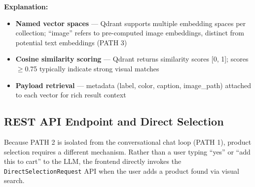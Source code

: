 \textbf{Explanation:}
\begin{itemize}
    \item \textbf{Named vector spaces} --- Qdrant supports multiple embedding spaces per collection; ``image'' refers to pre-computed image embeddings, distinct from potential text embeddings (PATH 3)
    \item \textbf{Cosine similarity scoring} --- Qdrant returns similarity scores [0, 1]; scores $\geq$0.75 typically indicate strong visual matches
    \item \textbf{Payload retrieval} --- metadata (label, color, caption, image\_path) attached to each vector for rich result context
\end{itemize}

\subsection{REST API Endpoint and Direct Selection}

Because PATH 2 is isolated from the conversational chat loop (PATH 1), product selection requires a different mechanism. Rather than a user typing ``yes'' or ``add this to cart'' to the LLM, the frontend directly invokes the \texttt{DirectSelectionRequest} API when the user adds a product found via visual search.

